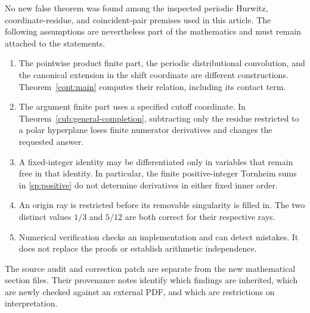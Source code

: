 No new false theorem was found among the inspected periodic Hurwitz,
coordinate-residue, and coincident-pair premises used in this article.
The following assumptions are nevertheless part of the mathematics
and must remain attached to the statements.

\begin{enumerate}
\item The pointwise product finite part, the periodic distributional
      convolution, and the canonical extension in the shift coordinate
      are different constructions. Theorem~\ref{cont:main} computes
      their relation, including its contact term.
\item The argument finite part uses a specified cutoff coordinate.
      In Theorem~\ref{cub:general-completion}, subtracting only the
      residue restricted to a polar hyperplane loses finite numerator
      derivatives and changes the requested answer.
\item A fixed-integer identity may be differentiated only in variables
      that remain free in that identity. In particular, the finite
      positive-integer Tornheim sums in \eqref{sp:positive} do not
      determine derivatives in either fixed inner order.
\item An origin ray is restricted before its removable singularity is
      filled in. The two distinct values $1/3$ and $5/12$ are both
      correct for their respective rays.
\item Numerical verification checks an implementation and can detect
      mistakes. It does not replace the proofs or establish arithmetic
      independence.
\end{enumerate}

The source audit and correction patch are separate from the new
mathematical section files. Their provenance notes identify which
findings are inherited, which are newly checked against an external
PDF, and which are restrictions on interpretation.
